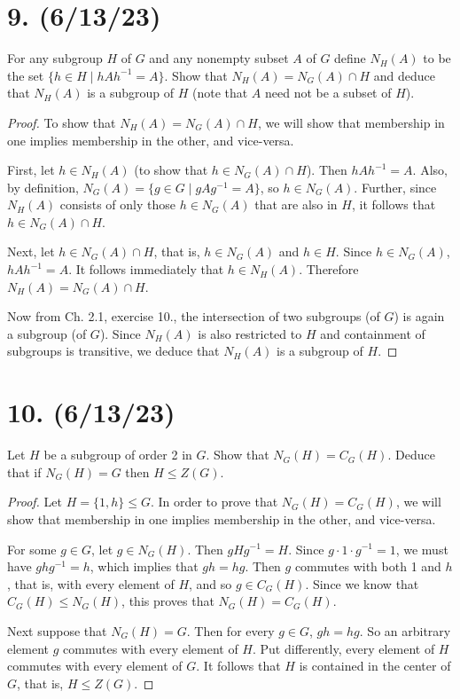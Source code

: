 \documentclass{article}
\begin{document}
\section*{9. (6/13/23)}

For any subgroup $H$ of $G$ and any nonempty subset $A$ of $G$ define $N_H(A)$ to be the set $\{ h \in H \mid hAh^{-1} = A \}$. Show that $N_H(A) = N_G(A) \cap H$ and deduce that $N_H(A)$ is a subgroup of $H$ (note that $A$ need not be a subset of $H$).

\begin{proof}
    To show that $N_H(A) = N_G(A) \cap H$, we will show that membership in one implies membership in the other, and vice-versa.

    First, let $h \in N_H(A)$ (to show that $h \in N_G(A) \cap H$). Then $hAh^{-1} = A$. Also, by definition, $N_G(A) = \{ g \in G \mid gAg^{-1} = A \}$, so $h \in N_G(A)$. Further, since $N_H(A)$ consists of only those $h \in N_G(A)$ that are also in $H$, it follows that $h \in N_G(A) \cap H$.

    Next, let $h \in N_G(A) \cap H$, that is, $h \in N_G(A)$ and $h \in H$. Since $h \in N_G(A)$, $hAh^{-1} = A$. It follows immediately that $h \in N_H(A)$. Therefore $N_H(A) = N_G(A) \cap H$.

    Now from Ch. 2.1, exercise 10., the intersection of two subgroups (of $G$) is again a subgroup (of $G$). Since $N_H(A)$ is also restricted to $H$ and containment of subgroups is transitive, we deduce that $N_H(A)$ is a subgroup of $H$.
\end{proof}

\section*{10. (6/13/23)}

Let $H$ be a subgroup of order 2 in $G$. Show that $N_G(H) = C_G(H)$. Deduce that if $N_G(H) = G$ then $H \leq Z(G)$.

\begin{proof}
    Let $H = \{ 1, h \} \leq G$. In order to prove that $N_G(H) = C_G(H)$, we will show that membership in one implies membership in the other, and vice-versa.

    For some $g \in G$, let $g \in N_G(H)$. Then $gHg^{-1} = H$. Since $g \cdot 1 \cdot g^{-1} = 1$, we must have $ghg^{-1} = h$, which implies that $gh = hg$. Then $g$ commutes with both 1 and $h$, that is, with every element of $H$, and so $g \in C_G(H)$. Since we know that $C_G(H) \leq N_G(H)$, this proves that $N_G(H) = C_G(H)$.

    Next suppose that $N_G(H) = G$. Then for every $g \in G$, $gh = hg$. So an arbitrary element $g$ commutes with every element of $H$. Put differently, every element of $H$ commutes with every element of $G$. It follows that $H$ is contained in the center of $G$, that is, $H \leq Z(G)$.
\end{proof}
\end{document}

